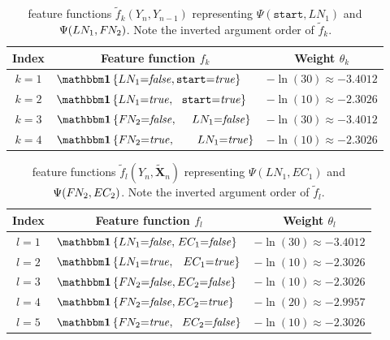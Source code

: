 \begin{table}[H]
\centering
\begin{tabular}{c l c}
 \toprule
 Index & \multicolumn{1}{c}{Feature function $f_k$} & Weight $\theta_k$ \\
 \midrule
 $k=1$ & $\identityfun\left\{LN_1{=}\mathit{false},\texttt{start}{=}\mathit{true}\right\}$ & $-\ln(30)\approx-3.4012$ \\
 $k=2$ & $\identityfun\left\{LN_1{=}\mathit{true},\ \ \texttt{start}{=}\mathit{true}\right\}$ & $-\ln(10)\approx-2.3026$ \\
 $k=3$ & $\identityfun\left\{F\rs N_2{=}\mathit{false},\ \ \ \ \hspace{-0.1mm}LN_1{=}\mathit{false}\right\}$ & $-\ln(30)\approx-3.4012$ \\
 $k=4$ & $\identityfun\left\{F\rs N_2{=}\mathit{true},\ \ \ \ \ \ \hspace{-0.1mm}LN_1{=}\mathit{true}\right\}$ & $-\ln(10)\approx-2.3026$\\
 \bottomrule
\end{tabular}
\caption{\Glspl{feature function} $\tilde{f}_k(Y_n,Y_{n-1})$ representing $\Psi(\texttt{start},LN_1)$ and $\Psi(LN_1,F\hspace{-0.07em} N_2)$. Note the inverted argument order of $\tilde{f}_k$.}
\label{tab:example-linear-chain-crf-feature-functions-f-k}
\end{table}

\begin{table}[H]
\centering
\begin{tabular}{c l c}
 \toprule
 Index & \multicolumn{1}{c}{Feature function $f_l$ } & Weight $\theta_l$ \\
 \midrule
 $l=1$ & $\identityfun\left\{LN_1{=}\mathit{false},\hspace{0.4mm}EC_1{=}\mathit{false}\right\}$ & $-\ln(30)\approx-3.4012$ \\
 $l=2$ & $\identityfun\left\{LN_1{=}\mathit{true},\ \ \hspace{0.4mm}EC_1{=}\mathit{true}\right\}$ & $-\ln(10)\approx-2.3026$ \\
 $l=3$ & $\identityfun\left\{F\rs N_2{=}\mathit{false},EC_2{=}\mathit{false}\right\}$ & $-\ln(10)\approx-2.3026$ \\
 $l=4$ & $\identityfun\left\{F\rs N_2{=}\mathit{false},EC_2{=}\mathit{true}\right\}$ & $-\ln(20)\approx-2.9957$ \\
 $l=5$ & $\identityfun\left\{F\rs N_2{=}\mathit{true},\ \ EC_2{=}\mathit{false}\right\}$ & $-\ln(10)\approx-2.3026$ \\
 \bottomrule
\end{tabular}
\caption{\Glspl{feature function} $\tilde{f}_l(Y_n,\tilde{\mathbf{X}}_n)$ representing $\Psi(LN_1,EC_1)$ and $\Psi(F\hspace{-0.07em} N_2,EC_2)$. Note the inverted argument order of $\tilde{f}_l$.}
\label{tab:example-linear-chain-crf-feature-functions-f-l}
\end{table}

